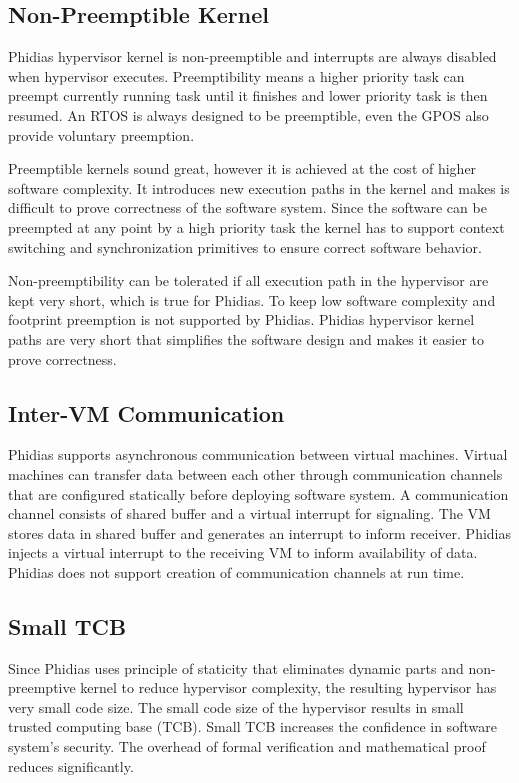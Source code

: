 \subsection{Non-Preemptible Kernel}
Phidias hypervisor kernel is non-preemptible and interrupts are always disabled when hypervisor executes. 
Preemptibility means a higher priority task can preempt currently running task until it finishes and lower priority task is then resumed.
An RTOS is always designed to be preemptible, even the GPOS also provide voluntary preemption.

Preemptible kernels sound great, however it is achieved at the cost of higher software complexity.  
It introduces new execution paths in the kernel and makes is difficult to prove correctness of the software system.
Since the software can be preempted at any point by a high priority task the kernel has to support context switching and
synchronization primitives to ensure correct software behavior.

Non-preemptibility can be tolerated if all execution path in the hypervisor are kept very short, which is true for Phidias.
To keep low software complexity and footprint preemption is not supported by Phidias.
Phidias hypervisor kernel paths are very short that simplifies the software design and makes it easier to prove correctness.

\subsection{Inter-VM Communication}
Phidias supports asynchronous communication between virtual machines.
Virtual machines can transfer data between each other through communication channels that
are configured statically before deploying software system.
A communication channel consists of shared buffer and a virtual interrupt for signaling.
The VM stores data in shared buffer and generates an interrupt to inform receiver.
Phidias injects a virtual interrupt to the receiving VM to inform availability of data.
Phidias does not support creation of communication channels at run time.

\subsection{Small TCB}
Since Phidias uses principle of staticity that eliminates dynamic parts and non-preemptive
kernel to reduce hypervisor complexity, the resulting hypervisor has very small code size.
The small code size of the hypervisor results in small trusted computing base (TCB).
Small TCB increases the confidence in software system's security.
The overhead of formal verification and mathematical proof reduces significantly.


